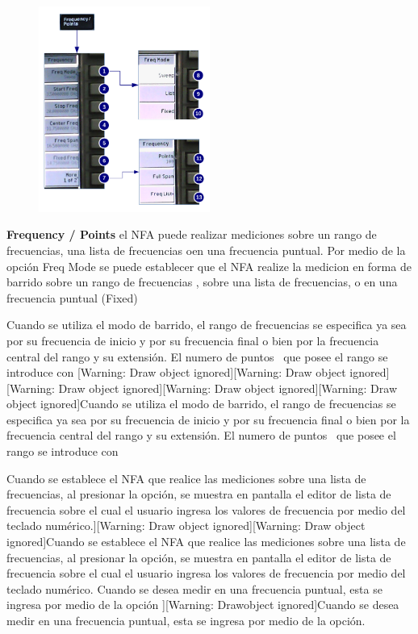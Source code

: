 	\begin{minipage}[t]{\textwidth}	
		\begin{figure}	
			\centering	
			\includegraphics[width=0.5\textwidth]{Imagenes/MenuFrequencyPointsN8975A.pdf}	
		\end{figure}	
		
		\textbf{Frequency / Points} el NFA puede realizar mediciones sobre un rango de frecuencias, una lista de frecuencias oen una frecuencia puntual. Por medio de la opción Freq Mode se puede establecer que el NFA realize la medicion en forma	de barrido sobre un rango de frecuencias , sobre una lista de frecuencias, o en una frecuencia puntual (Fixed) 
		
		Cuando se utiliza el modo de barrido, el rango de frecuencias se especifica ya sea por su frecuencia de inicio y por su frecuencia final o bien por la frecuencia central del rango y su extensión. El numero de puntos \ que posee el rango se introduce con [Warning: Draw object ignored][Warning: Draw object ignored][Warning: Draw object ignored][Warning: Draw object ignored][Warning: Draw object ignored]Cuando se utiliza el modo de barrido, el rango de frecuencias se especifica ya sea por su frecuencia de inicio y por su frecuencia final o bien por la frecuencia central del rango y su extensión. El numero de puntos \ que posee el rango se introduce con 
				
		Cuando se establece el NFA que realice las mediciones sobre una lista de frecuencias, al presionar la
		opción, se muestra en pantalla el editor de lista de frecuencia sobre el cual el usuario ingresa los valores de frecuencia por medio del teclado numérico.][Warning: Draw object ignored][Warning: Draw object ignored]Cuando se establece el NFA que realice las mediciones sobre una lista de frecuencias, al presionar la opción, se muestra en pantalla el editor de lista de frecuencia sobre el cual el usuario ingresa los valores de frecuencia por medio del	teclado numérico.
		Cuando se desea medir en una frecuencia puntual, esta se ingresa por medio de la opción ][Warning: Drawobject ignored]Cuando se desea medir en una frecuencia puntual, esta se ingresa por medio de la opción. 		
	\end{minipage}
	
